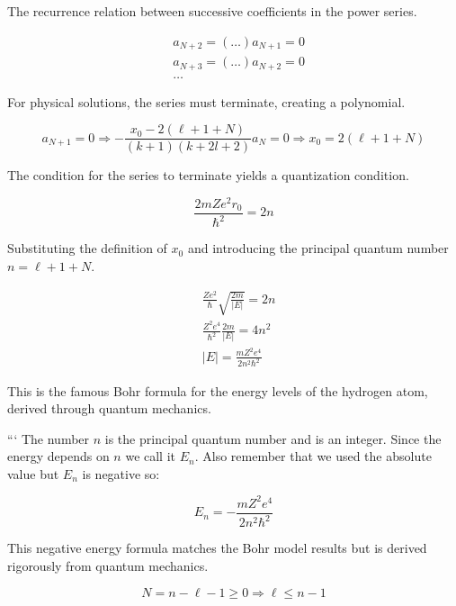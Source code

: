 \documentclass[10pt]{article}
\begin{document}
The recurrence relation between successive coefficients in the power series.

\begin{align*}
& a_{N+2}=(\ldots) a_{N+1}=0 \\
& a_{N+3}=(\ldots) a_{N+2}=0  \tag{9.62}\\
& \ldots
\end{align*}

For physical solutions, the series must terminate, creating a polynomial.

\begin{equation*}
a_{N+1}=0 \Longrightarrow-\frac{x_{0}-2(\ell+1+N)}{(k+1)(k+2 l+2)} a_{N}=0 \Longrightarrow x_{0}=2(\ell+1+N) \tag{9.63}
\end{equation*}

The condition for the series to terminate yields a quantization condition.

\begin{equation*}
\frac{2 m Z e^{2} r_{0}}{\hbar^{2}}=2 n \tag{9.64}
\end{equation*}

Substituting the definition of $x_0$ and introducing the principal quantum number $n = \ell+1+N$.

\begin{align*}
& \frac{Z e^{2}}{\hbar} \sqrt{\frac{2 m}{|E|}}=2 n \\
& \frac{Z^{2} e^{4}}{\hbar^{2}} \frac{2 m}{|E|}=4 n^{2}  \tag{9.65}\\
& |E|=\frac{m Z^{2} e^{4}}{2 n^{2} \hbar^{2}}
\end{align*}

This is the famous Bohr formula for the energy levels of the hydrogen atom, derived through quantum mechanics.

```
The number $n$ is the principal quantum number and is an integer. Since the energy depends on $n$ we call it $E_{n}$. Also remember that we used the absolute value but $E_{n}$ is negative so:

\begin{equation*}
E_{n}=-\frac{m Z^{2} e^{4}}{2 n^{2} \hbar^{2}} \tag{9.66}
\end{equation*}

This negative energy formula matches the Bohr model results but is derived rigorously from quantum mechanics.

\begin{equation*}
N=n-\ell-1 \geq 0 \Longrightarrow \ell \leq n-1 \tag{9.67}
\end{equation*}
\end{document}
